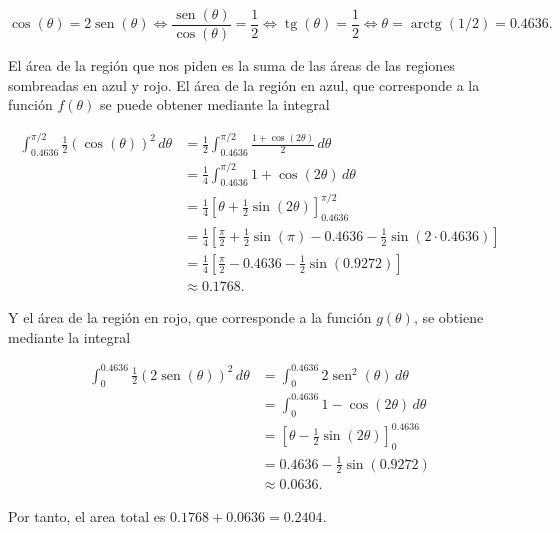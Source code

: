 \documentclass[
  a4paper,
]{scrreport}
\theoremstyle{definition}
\theoremstyle{remark}
\begin{document}
\begin{tcolorbox}
\[
\cos(\theta) = 2\operatorname{sen}(\theta)
\Leftrightarrow \frac{\operatorname{sen}(\theta)}{\cos(\theta)} = \frac{1}{2}
\Leftrightarrow \operatorname{tg}(\theta) = \frac{1}{2}
\Leftrightarrow \theta = \operatorname{arctg}(1/2) = 0.4636.
\]

El área de la región que nos piden es la suma de las áreas de las
regiones sombreadas en azul y rojo. El área de la región en azul, que
corresponde a la función \(f(\theta)\) se puede obtener mediante la
integral

\begin{align*}
\int_{0.4636}^{\pi/2} \frac{1}{2}(\cos(\theta))^2\, d\theta
&= \frac{1}{2} \int_{0.4636}^{\pi/2} \frac{1 + \cos(2\theta)}{2}\, d\theta \\
&= \frac{1}{4} \int_{0.4636}^{\pi/2} 1 + \cos(2\theta)\, d\theta \\
&= \frac{1}{4} \left[\theta + \frac{1}{2}\sin(2\theta)\right]_{0.4636}^{\pi/2} \\
&= \frac{1}{4} \left[\frac{\pi}{2} + \frac{1}{2}\sin(\pi) - 0.4636 - \frac{1}{2}\sin(2\cdot 0.4636)\right] \\
&= \frac{1}{4} \left[\frac{\pi}{2} - 0.4636 - \frac{1}{2}\sin(0.9272)\right] \\
&\approx 0.1768.
\end{align*}

Y el área de la región en rojo, que corresponde a la función
\(g(\theta)\), se obtiene mediante la integral

\begin{align*}
\int_{0}^{0.4636} \frac{1}{2}(2\operatorname{sen}(\theta))^2\, d\theta 
&= \int_{0}^{0.4636} 2\operatorname{sen}^2(\theta)\, d\theta \\
&= \int_{0}^{0.4636} 1 - \cos(2\theta)\, d\theta \\
&= \left[\theta - \frac{1}{2}\sin(2\theta)\right]_{0}^{0.4636} \\
&= 0.4636 - \frac{1}{2}\sin(0.9272) \\
&\approx 0.0636.
\end{align*}

Por tanto, el area total es \(0.1768 + 0.0636 = 0.2404\).

\end{tcolorbox}
\end{document}
